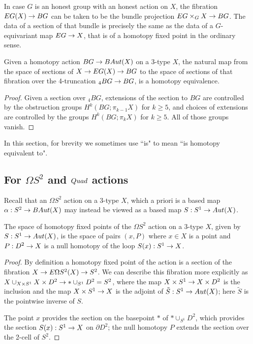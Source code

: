 \documentclass{amsart}
\begin{document}
\begin{remark}
In case $G$ is an honest group with an honest action on $X$, the fibration $EG(X) \rightarrow BG$ can be taken to be the bundle projection $EG \times_G X \rightarrow BG$.  The data of a section of that bundle is precisely the same as the data of a $G$-equivariant map $EG \rightarrow X$, that is of a homotopy fixed point in the ordinary sense.
\end{remark}

\begin{proposition} \label{prop-hofptrunc}
Given a homotopy action $BG \rightarrow BAut(X)$ on a 3-type $X$, the natural map from the space of sections of $X \rightarrow EG(X) \rightarrow BG$ to the space of sections of that fibration over the 4-truncation ${}_4 BG \rightarrow BG$, is a homotopy equivalence.
\end{proposition}
\begin{proof}
Given a section over ${}_4 BG$, extensions of the section to $BG$ are controlled by the obstruction groups $H^k(BG;\pi_{k-1} X)$ for $k \geq 5$, and choices of extensions are controlled by the groups $H^k(BG;\pi_k X)$ for $k \geq 5$.  All of those groups vanish.
\end{proof}

In this section, for brevity we sometimes use ``is" to mean ``is homotopy equivalent to".

\subsection{For $\Omega S^2$ and $Quad$ actions}

Recall that an $\Omega S^2$ action on a 3-type $X$, which a priori is a based map $\alpha: S^2 \rightarrow BAut(X)$ may instead be viewed as a based map $S: S^1 \rightarrow Aut(X)$.

\begin{proposition}
The space of homotopy fixed points of the $\Omega S^2$ action on a 3-type $X$, given by $S: S^1 \rightarrow Aut(X)$, is the space of pairs $(x,P)$ where $x \in X$ is a point and $P: D^2 \rightarrow X$ is a null homotopy of the loop $S(x): S^1 \rightarrow X$.
\end{proposition}
\begin{proof}
By definition a homotopy fixed point of the action is a section of the fibration $X \rightarrow E\Omega S^2(X) \rightarrow S^2$.  We can describe this fibration more explicitly as $X \cup_{X \times S^1} X \times D^2 \rightarrow \ast \cup_{S^1} D^2 = S^2$, where the map $X \times S^1 \rightarrow X \times D^2$ is the inclusion and the map $X \times S^1 \rightarrow X$ is the adjoint of $\tilde{S}: S^1 \rightarrow Aut(X)$; here $\tilde{S}$ is the pointwise inverse of $S$.  %

The point $x$ provides the section on the basepoint $\ast$ of $\ast \cup_{S^1} D^2$, which provides the section $S(x): S^1 \rightarrow X$ on $\partial D^2$; the null homotopy $P$ extends the section over the 2-cell of $S^2$.
\end{proof}
\end{document}
